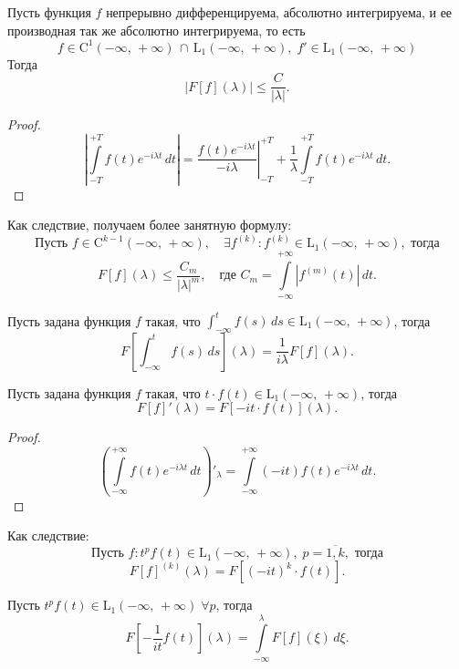 \begin{theorem}
        Пусть функция $f$ непрерывно дифференцируема, абсолютно интегрируема, и ее производная так же абсолютно интегрируема, то есть
$$
        f \in \mathrm{C}^1(-\infty,\,+\infty)\,\cap\,\mathrm{L}_1(-\infty,\,+\infty),\;f' \in \mathrm{L}_1(-\infty,\,+\infty)
$$
        Тогда
$$
        |F[f](\lambda)| \leqslant \frac{C}{|\lambda|}.
$$
\end{theorem}
\begin{proof}
$$
        \left|\int\limits_{-T}^{+T} f(t) e^{-i\lambda t}\,dt\right|
        = \left.\frac{f(t)e^{-i\lambda t}}{-i\lambda}\right|_{-T}^{+T} + \frac{1}{\lambda}\int\limits_{-T}^{+T} f(t) e^{-i\lambda t}\,dt.
$$
\end{proof}
\begin{remark}
        Как следствие, получаем более занятную формулу:
$$
        \mbox{Пусть } f \in \mathrm{C}^{k-1}(-\infty,\,+\infty),\quad \exists f^{(k)}:f^{(k)}\in\mathrm{L}_1(-\infty,\,+\infty), \mbox{ тогда} 
$$
\begin{equation}
        F[f](\lambda) \leqslant \frac{C_m}{|\lambda|^m},\quad \mbox{где } C_m = \int\limits_{-\infty}^{+\infty}|f^{(m)}(t)|\,dt.
\end{equation}
\end{remark}
\begin{theorem}
        Пусть задана функция $f$ такая, что $\int_{-\infty}^t f(s)\,ds \in \mathrm{L}_1(-\infty,\,+\infty)$, тогда
$$
        F\left[
\int_{-\infty}^t f(s)\,ds
        \right] (\lambda)
=
        \frac1{i\lambda}F[f](\lambda).
$$
\end{theorem}
\begin{theorem}
        Пусть задана функция $f$ такая, что $t\cdot f(t) \in \mathrm{L}_1(-\infty,\,+\infty)$, тогда
$$
        F[f]'(\lambda) = F[-it\cdot f(t)](\lambda).
$$
\end{theorem}
\begin{proof}
$$
        \left(
\int\limits_{-\infty}^{+\infty}f(t)e^{-i\lambda t}\,dt
        \right)'_{\lambda}
=
        \int\limits_{-\infty}^{+\infty} (-it)f(t)e^{-i\lambda t}\,dt.
$$
\end{proof}
\begin{remark}
        Как следствие:
$$
        \mbox{Пусть } f : t^pf(t)\in \mathrm{L}_1(-\infty,\,+\infty), \; p = \overline{1, k}, \mbox{ тогда}
$$
\begin{equation}
        F[f]^{(k)}(\lambda) = F[(-it)^k\cdot f(t)].
\end{equation}
\end{remark}
\begin{theorem}
        Пусть $t^p f(t) \in \mathrm{L}_1(-\infty,\,+\infty)\;\forall p$, тогда
\begin{equation}
        F\left[
-\frac{1}{it}f(t)
        \right] (\lambda)
=
        \int\limits_{-\infty}^{\lambda} F[f](\xi)\,d\xi.
\end{equation}
\end{theorem}

